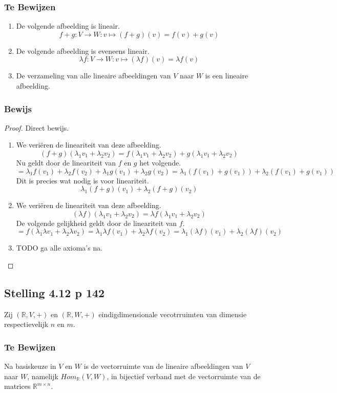 \documentclass[lineaire_algebra_oplossingen.tex]{subfiles}
\begin{document}
\subsubsection*{Te Bewijzen}
\begin{enumerate}
\item De volgende afbeelding is lineair.
\[f+g: V \rightarrow W: v\mapsto(f+g)(v)=f(v)+g(v)\]
\item De volgende afbeelding is eveneens lineair.
\[\lambda f: V\rightarrow W: v\mapsto (\lambda f)(v) = \lambda f(v)\]
\item De verzameling van alle lineaire afbeeldingen van $V$ naar $W$ is een lineaire afbeelding.
\end{enumerate}
\subsubsection*{Bewijs}
\begin{proof}
Direct bewijs.
\begin{enumerate}
\item
We veri\"eren de lineariteit van deze afbeelding.
\[
(f+g)(\lambda_1v_1+\lambda_2v_2) = f(\lambda_1v_1+\lambda_2v_2) + g(\lambda_1v_1+\lambda_2v_2)
\]
Nu geldt door de lineariteit van $f$ en $g$ het volgende.
\[
= \lambda_1f(v_1)+\lambda_2f(v_2) + \lambda_1g(v_1)+\lambda_2g(v_2) = \lambda_1(f(v_1)+g(v_1)) + \lambda_2(f(v_1)+g(v_1))
\]
Dit is precies wat nodig is voor lineariteit.
\[
\lambda_1(f+g)(v_1)+\lambda_2(f+g)(v_2)
\]
\item
We veri\"eren de lineariteit van deze afbeelding.
\[
(\lambda f)(\lambda_1v_1+\lambda_2v_2) = \lambda f(\lambda_1v_1+\lambda_2v_2)
\]
De volgende gelijkheid geldt door de lineariteit van $f$. 
\[
=  f(\lambda_1\lambda v_1+\lambda_2\lambda v_2) = \lambda_1\lambda f(v_1)+\lambda_2\lambda f(v_2) = 
\lambda_1(\lambda f)(v_1)+\lambda_2(\lambda f)(v_2)
\]
\item
TODO ga alle axioma's na.
\end{enumerate}
\end{proof}

\subsection{Stelling 4.12 p 142}
Zij $(\mathbb{R},V,+)$ en  $(\mathbb{R},W,+)$ eindigdimensionale vecotrruimten van dimensie respectievelijk $n$ en $m$.
\subsubsection*{Te Bewijzen}
Na basiskeuze in $V$ en $W$ is de vectorruimte van de lineaire afbeeldingen van $V$ naar $W$, namelijk $Hom_{\mathbb{R}}(V,W)$, in bijectief verband met de vectorruimte van de matrices $\mathbb{R}^{m\times n}$.
\end{document}
